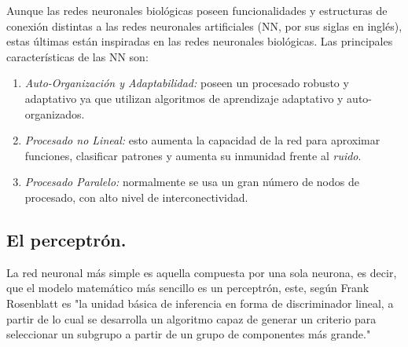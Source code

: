\documentclass[12pt,letterpaper,oneside,openright]{book}
\begin{document}
	Aunque las redes neuronales biológicas poseen funcionalidades y estructuras de conexión distintas a las redes neuronales artificiales (NN, por sus siglas en inglés), estas últimas están inspiradas en las redes neuronales biológicas. Las principales características de las NN son:
	\begin{enumerate}
		\item \textit{Auto-Organización y Adaptabilidad:} poseen un procesado robusto y adaptativo ya que utilizan algoritmos de aprendizaje adaptativo y auto-organizados.
		\item \textit{Procesado no Lineal:} esto aumenta la capacidad de la red para aproximar funciones, clasificar patrones y aumenta su inmunidad frente al \textit{ruido}.
		\item \textit{Procesado Paralelo:} normalmente se usa un gran número de nodos de procesado, con alto nivel de interconectividad.
	\end{enumerate}
	\subsection{El perceptrón.}
	La red neuronal más simple es aquella compuesta por una sola neurona, es decir, que el modelo matemático más sencillo es un perceptrón, este, según Frank Rosenblatt \cite{perceptron} es "la unidad básica de inferencia en forma de discriminador lineal, a partir de lo cual se desarrolla un algoritmo capaz de generar un criterio para seleccionar un subgrupo a partir de un grupo de componentes más grande."
\end{document}
